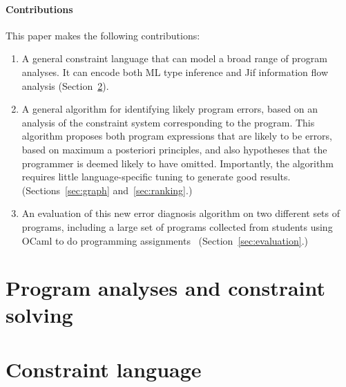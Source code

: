 \paragraph{Contributions}

This paper makes the following contributions:

\begin{enumerate}
\item
A general constraint language that can model a broad
range of program analyses. It can encode both ML type
inference and Jif information flow analysis
(Section~\ref{sec:language}).

\item
A general algorithm for identifying likely program errors,
based on an analysis of the constraint system corresponding
to the program. This algorithm proposes both program expressions
that are likely to be errors, based on maximum a posteriori
principles, and also hypotheses that the programmer is
deemed likely to have omitted. Importantly, the algorithm
requires little language-specific tuning to generate good results.
(Sections~\ref{sec:graph} and~\ref{sec:ranking}.)

\item
An evaluation of this new error diagnosis algorithm on two
different sets of programs, including a large set of programs
collected from students using OCaml to do
programming assignments~\cite{lerner:pldi07}
(Section~\ref{sec:evaluation}.)

\end{enumerate}

\section{Program analyses and constraint solving}



\section{Constraint language}
\label{sec:language}

